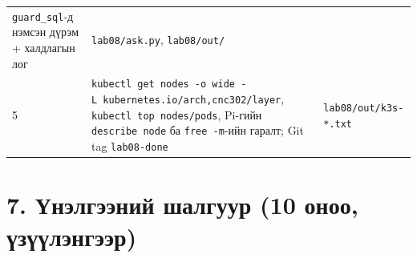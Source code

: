 \begin{longtable}[]{@{}lll@{}}
\begin{minipage}[t]{0.30\columnwidth}
\texttt{guard\_sql}-д нэмсэн дүрэм + халдлагын лог\strut
\end{minipage} & \begin{minipage}[t]{0.30\columnwidth}\raggedright
\texttt{lab08/ask.py}, \texttt{lab08/out/}\strut
\end{minipage}\tabularnewline
\begin{minipage}[t]{0.30\columnwidth}\raggedright
5\strut
\end{minipage} & \begin{minipage}[t]{0.30\columnwidth}\raggedright
\texttt{kubectl\ get\ nodes\ -o\ wide\ -L\ kubernetes.\allowbreak{}io/\allowbreak{}arch,cnc302/\allowbreak{}layer}, \texttt{kubectl\ top\ nodes/\allowbreak{}pods}, Pi-гийн \texttt{describe\ node} ба \texttt{free\ -m}-ийн гаралт; Git tag \texttt{lab08-done}\strut
\end{minipage} & \begin{minipage}[t]{0.30\columnwidth}\raggedright
\texttt{lab08/\allowbreak{}out/\allowbreak{}k3s-*.\allowbreak{}txt}\strut
\end{minipage}\tabularnewline
\bottomrule
\end{longtable}\endgroup

\hypertarget{ux4afux43dux44dux43bux433ux44dux44dux43dux438ux439-ux448ux430ux43bux433ux443ux443ux440-10-ux43eux43dux43eux43e-ux4afux437ux4afux4afux43bux44dux43dux433ux44dux44dux440}{%
\section{7. Үнэлгээний шалгуур (10 оноо, үзүүлэнгээр)}\label{ux4afux43dux44dux43bux433ux44dux44dux43dux438ux439-ux448ux430ux43bux433ux443ux443ux440-10-ux43eux43dux43eux43e-ux4afux437ux4afux4afux43bux44dux43dux433ux44dux44dux440}}


